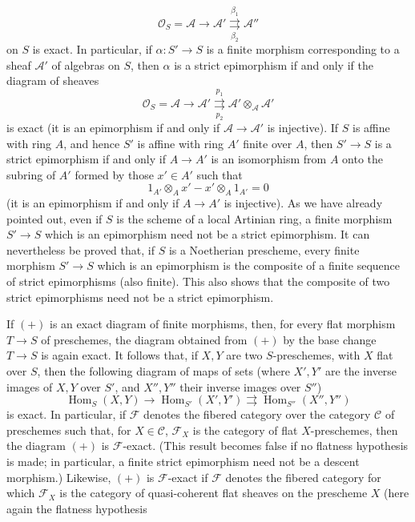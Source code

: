 \[
  \mathcal O_S=\mathcal A\longrightarrow\mathcal A'
  \overset{\beta_1}{\underset{\beta_2}{\rightrightarrows}}\mathcal A''
\]
on $S$ is exact. In particular, if $\alpha:S'\longrightarrow S$ is a finite
morphism corresponding to a sheaf $\mathcal A'$ of algebras on $S$, then
$\alpha$ is a strict epimorphism if and only if the diagram of sheaves
\[
  \mathcal O_S=\mathcal A\longrightarrow\mathcal A'
  \overset{p_1}{\underset{p_2}{\rightrightarrows}}
  \mathcal A'\otimes_{\mathcal A}\mathcal A'
\]
is exact (it is an epimorphism if and only if
$\mathcal A\longrightarrow\mathcal A'$ is injective). If $S$ is affine with
ring $A$, and hence $S'$ is affine with ring $A'$ finite over $A$, then
$S'\longrightarrow S$ is a strict epimorphism if and only if
$A\longrightarrow A'$ is an isomorphism from $A$ onto the subring of $A'$
formed by those $x'\in A'$ such that
\[
  1_{A'}\otimes_Ax'-x'\otimes_A1_{A'}=0
\]
(it is an epimorphism if and only if $A\longrightarrow A'$ is injective). As
we have already pointed out, even if $S$ is the scheme of a local Artinian
ring, a finite morphism $S'\longrightarrow S$ which is an epimorphism need not
be a strict epimorphism. It can nevertheless be proved that, if $S$ is a
Noetherian prescheme, every finite morphism $S'\longrightarrow S$ which is an
epimorphism is the composite of a finite sequence of strict epimorphisms (also
finite). This also shows that the composite of two strict epimorphisms need not
be a strict epimorphism.

 If $(+)$ is an exact diagram of finite morphisms, then, for every
flat morphism $T\longrightarrow S$ of preschemes, the diagram obtained from
$(+)$ by the base change $T\longrightarrow S$ is again exact. It follows that,
if $X,Y$ are two $S$-preschemes, with $X$ flat over $S$, then the following
diagram of maps of sets (where $X',Y'$ are the inverse images of $X,Y$ over
$S'$, and $X'',Y''$ their inverse images over $S''$)
\[
  \operatorname{Hom}_S(X,Y)\longrightarrow
  \operatorname{Hom}_{S'}(X',Y')
  \rightrightarrows
  \operatorname{Hom}_{S''}(X'',Y'')
\]
is exact. In particular, if $\mathcal F$ denotes the fibered category over the
category $\mathcal C$ of preschemes such that, for $X\in\mathcal C$,
$\mathcal F_X$ is the category of flat $X$-preschemes, then the diagram $(+)$
is $\mathcal F$-exact. (This result becomes false if no flatness hypothesis is
made; in particular, a finite strict epimorphism need not be a descent
morphism.) Likewise, $(+)$ is $\mathcal F$-exact if $\mathcal F$ denotes the
fibered category for which $\mathcal F_X$ is the category of quasi-coherent flat
sheaves on the prescheme $X$ (here again the flatness hypothesis

